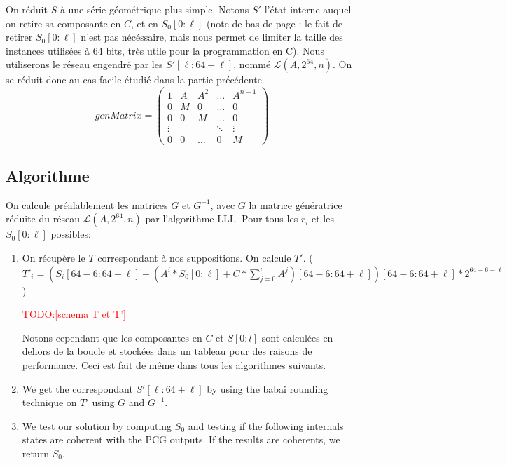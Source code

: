 \documentclass[preprint]{iacrtrans}
\newcommand{\todo}[1]{\textcolor{red}{TODO:[#1]}}
\begin{document}
On réduit $S$ à une série géométrique plus simple. Notons $S'$ l'état interne auquel on retire sa composante en $C$, et en $S_0[0:\ell]$ (note de bas de page : le fait de retirer $S_0[0:\ell]$ n'est pas nécéssaire, mais nous permet de limiter la taille des instances utilisées à 64 bits, très utile pour la programmation en C). Nous utiliserons le réseau engendré par les $S'[\ell : 64 + \ell]$, nommé $\mathcal{L}(A,2^64,n)$. On se réduit donc au cas facile étudié dans la partie précédente.
\begin{equation}
genMatrix =
\begin{pmatrix} 
1 & A & A ^2 & \dots & A ^{n- 1}\\
0 & M & 0 & \dots & 0\\
0 & 0 & M & \dots & 0\\
\vdots & & & \ddots & \vdots\\
0 & 0 & \dots & 0 & M
\end{pmatrix}
\end{equation}

\subsection{Algorithme}
On calcule préalablement les matrices $G$ et $G^{-1}$, avec $G$ la matrice génératrice réduite du réseau $\mathcal{L}(A,2^64,n)$ par l'algorithme LLL.
Pour tous les $r_i$ et les $S_0[0 : \ell]$ possibles:\\
\begin{enumerate}
\item On récupère le $T$ correspondant à nos suppositions. On calcule $T'$. ($T'_i = (S_i[64 - 6 : 64 + \ell] - (A^i*S_0[0 : \ell] + C * \sum_{j = 0}^i A^j)[64 - 6 : 64 + \ell])[64 - 6 : 64 + \ell] * 2^{64 - 6 - \ell}$)

\todo{schema T et T'}

Notons cependant que les composantes en $C$ et $S[0:l]$ sont calculées en dehors de la boucle et stockées dans un tableau pour des raisons de performance. Ceci est fait de même dans tous les algorithmes suivants.

\item We get the correspondant $S'[\ell : 64 + \ell]$ by using the babai rounding technique on $T'$ using $G$ and $G^{-1}$.

\item We test our solution by computing $S_0$ and testing if the following internals states are coherent with the PCG outputs. If the results are coherents, we return $S_0$.

\end{enumerate}
\end{document}

